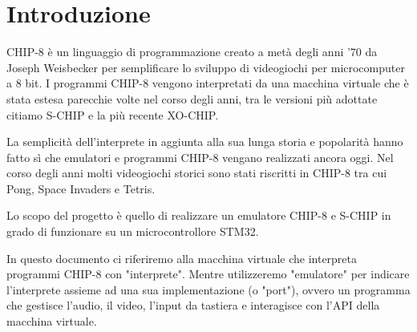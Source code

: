 \documentclass[a4paper]{article}
\begin{document}
\tableofcontents
\listoffigures
\listoftables

\newpage

\begin{center}
\end{center}

\section{Introduzione}

CHIP-8 è un linguaggio di programmazione creato a metà degli anni '70
da Joseph Weisbecker per semplificare lo sviluppo di videogiochi per
microcomputer a 8 bit. I programmi CHIP-8 vengono interpretati da una
macchina virtuale che è stata estesa parecchie volte nel corso degli
anni, tra le versioni più adottate citiamo S-CHIP e la più recente
XO-CHIP.

La semplicità dell'interprete in aggiunta alla sua lunga storia e
popolarità hanno fatto sì che emulatori e programmi CHIP-8 vengano
realizzati ancora oggi.
Nel corso degli anni molti videogiochi storici sono stati riscritti
in CHIP-8 tra cui Pong, Space Invaders e Tetris.

Lo scopo del progetto è quello di realizzare un emulatore CHIP-8 e
S-CHIP in grado di funzionare su un microcontrollore STM32.

In questo documento ci riferiremo alla macchina virtuale che
interpreta programmi CHIP-8 con "interprete". Mentre utilizzeremo
"emulatore" per indicare l'interprete assieme ad una sua
implementazione (o "port"), ovvero un programma che gestisce
l'audio, il video, l'input da tastiera e interagisce con l'API della
macchina virtuale.
\end{document}
